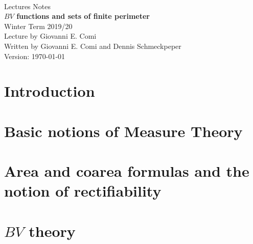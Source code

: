 \documentclass[ngerman]{report}
\begin{document}
\begin{titlepage}
  \centering\text{}\\[14ex]
  \Huge Lectures Notes\\[2ex]
  \Huge {\bf $BV$ functions and sets of finite perimeter}\\[18ex]
  \LARGE Winter Term 2019/20\\[22ex]
  Lecture by Giovanni E. Comi\\[2ex]
  Written by Giovanni E. Comi and Dennis Schmeckpeper\\[8ex]
  \Large Version: \today\\
\end{titlepage}
\tableofcontents
\chapter*{Introduction}

\chapter{Basic notions of Measure Theory}

\chapter{Area and coarea formulas and the notion of rectifiability}

\chapter{$BV$ theory}


\cleardoublepage 


\end{document}
